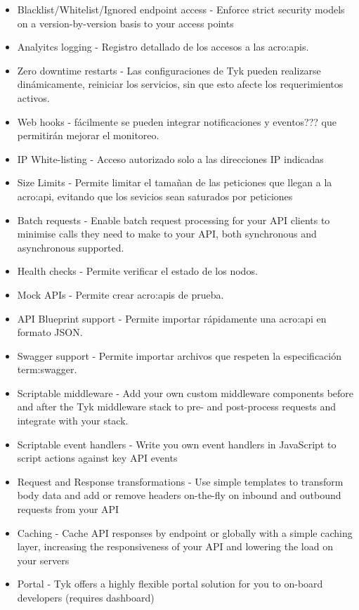\begin{itemize}
\begin{itemize}
  \end{itemize}
  \item Blacklist/Whitelist/Ignored endpoint access - Enforce strict security models on a version-by-version basis to your access points
  \item Analyitcs logging - Registro detallado de los accesos a las \glspl{acro:api}.
  \item Zero downtime restarts - Las configuraciones de Tyk pueden realizarse dinámicamente, reiniciar los servicios, sin que esto afecte los requerimientos activos.
  \item Web hooks - fácilmente se pueden integrar notificaciones y eventos??? que permitirán mejorar el monitoreo.
  \item IP White-listing - Acceso autorizado solo a las direcciones IP indicadas
  \item Size Limits - Permite limitar el tamañan de las peticiones que llegan a la \gls{acro:api}, evitando que los sevicios sean saturados por peticiones
  \item Batch requests - Enable batch request processing for your API clients to minimise calls they need to make to your API, both synchronous and asynchronous supported.
  \item Health checks - Permite verificar el estado de los nodos.
  \item Mock APIs - Permite crear \glspl{acro:api} de prueba.
  \item API Blueprint support - Permite importar rápidamente una \gls{acro:api} en formato JSON.
  \item Swagger support - Permite importar archivos que respeten la especificación \gls{term:swagger}.
  \item Scriptable middleware - Add your own custom middleware components before and after the Tyk middleware stack to pre- and post-process requests and integrate with your stack.
  \item Scriptable event handlers - Write you own event handlers in JavaScript to script actions against key API events
  \item Request and Response transformations - Use simple templates to transform body data and add or remove headers on-the-fly on inbound and outbound requests from your API
  \item Caching - Cache API responses by endpoint or globally with a simple caching layer, increasing the responsiveness of your API and lowering the load on your servers
  \item Portal - Tyk offers a highly flexible portal solution for you to on-board developers (requires dashboard)

\end{itemize}
